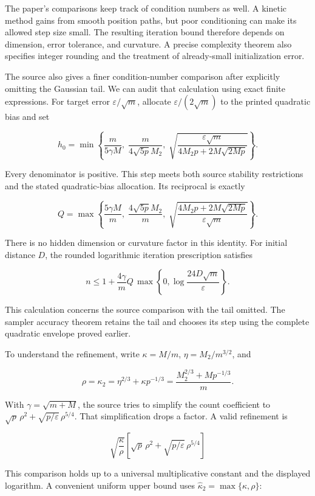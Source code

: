 \documentclass[11pt,a4paper]{article}
\begin{document}
The paper's comparisons keep track of condition numbers as well. A kinetic
method gains from smooth position paths, but poor conditioning can make its
allowed step size small. The resulting iteration bound therefore depends on dimension, error tolerance, and curvature. A precise
complexity theorem also specifies integer rounding and the treatment of
already-small initialization error.




The source also gives a finer condition-number comparison after explicitly
omitting the Gaussian tail. We can audit that calculation using exact finite expressions. For target error \(\varepsilon/\sqrt m\), allocate
\(\varepsilon/(2\sqrt m)\) to the printed quadratic bias and set


\[h_0=\min\left\{\frac m{5\gamma M},\;
\frac m{4\sqrt{5p}M_2},\;
\sqrt{\frac{\varepsilon\sqrt m}{4M_2p+2M\sqrt{2Mp}}}\right\}.\]


Every denominator is positive. This step meets both source stability
restrictions and the stated quadratic-bias allocation. Its reciprocal is
exactly


\[Q=\max\left\{\frac{5\gamma M}m,\;
\frac{4\sqrt{5p}M_2}m,\;
\sqrt{\frac{4M_2p+2M\sqrt{2Mp}}{\varepsilon\sqrt m}}\right\}.\]


There is no hidden dimension or curvature factor in this identity. For
initial distance \(D\), the rounded logarithmic iteration prescription satisfies


\[n\le1+\frac{4\gamma}{m}Q\,
\max\left\{0,\log\frac{24D\sqrt m}{\varepsilon}\right\}.\]


This calculation concerns the source comparison with the tail omitted.
The sampler accuracy theorem retains the tail and chooses its step
using the complete quadratic envelope proved earlier.




To understand the refinement, write
\(\kappa=M/m\), \(\eta=M_2/m^{3/2}\), and


\[\rho=\kappa_2=\eta^{2/3}+\kappa p^{-1/3}
=\frac{M_2^{2/3}+Mp^{-1/3}}m.\]


With \(\gamma=\sqrt{m+M}\), the source tries to simplify the count
coefficient to \(\sqrt p\,\rho^2+\sqrt{p/\varepsilon}\,\rho^{5/4}\).
That simplification drops a factor. A valid refinement is


\[\sqrt{\frac\kappa\rho}\left[
\sqrt p\,\rho^2+\sqrt{p/\varepsilon}\,\rho^{5/4}\right]\]


This comparison holds up to a universal multiplicative constant and the displayed logarithm.
A convenient uniform upper bound uses
\(\widehat\kappa_2=\max\{\kappa,\rho\}\):
\end{document}
